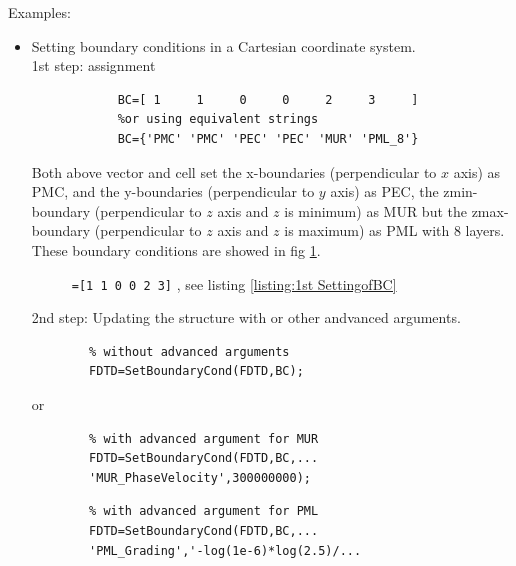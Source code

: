 	\begin{FontDescr}{Examples:}
	  \begin{itemize}
	  \item    Setting boundary conditions in a Cartesian coordinate system.\\
		1st step:  assignment
	      \begin{myindentpar}
		    \begin{lstlisting}[caption={\matv{BC} assignment as fig \ref{fig:Ex. 1st of SetBoundaryCond} },label={listing:1st SettingofBC}]
		    %using numbers
		    BC=[ 1     1     0     0     2     3     ]
		    %or using equivalent strings
		    BC={'PMC' 'PMC' 'PEC' 'PEC' 'MUR' 'PML_8'}
				\end{lstlisting}
		    Both above vector and cell set  the x-boundaries (perpendicular to $x$ axis) as PMC, and the y-boundaries (perpendicular to $y$ axis) as PEC, the zmin-boundary (perpendicular to $z$ axis and $z$ is minimum) as MUR but the zmax-boundary (perpendicular to $z$ axis and $z$ is maximum) as PML with 8 layers. These boundary conditions are showed in fig \ref{fig:Ex. 1st of SetBoundaryCond}.
			\begin{figure}[ht]
				\centering
			      \qquad
			      \qquad
				\caption[1st example for the setting of boundary conditions]{ \texttt{=[1 1  0 0  2 3]} , see listing \ref{listing:1st SettingofBC}}
				\label{fig:Ex. 1st of SetBoundaryCond}
			  \end{figure}
	      \end{myindentpar}
		2nd step: Updating the  structure with  or other andvanced arguments.
		\begin{myindentpar}
			      \begin{lstlisting}
	    % without advanced arguments
	    FDTD=SetBoundaryCond(FDTD,BC);
			      \end{lstlisting}
				or
			      \begin{lstlisting}
	    % with advanced argument for MUR
	    FDTD=SetBoundaryCond(FDTD,BC,...
		'MUR_PhaseVelocity',300000000);
				  \end{lstlisting}
			      \begin{lstlisting}
	    % with advanced argument for PML
	    FDTD=SetBoundaryCond(FDTD,BC,...
		'PML_Grading','-log(1e-6)*log(2.5)/...

\end{lstlisting}
\end{myindentpar}
\end{itemize}
\end{FontDescr}
